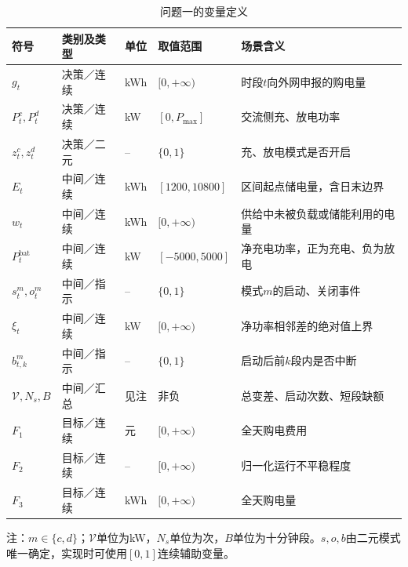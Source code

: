 \documentclass[withoutpreface,bwprint]{cumcmthesis}
\begin{document}
\begin{table}[htbp]
 \centering\small
 \caption{问题一的变量定义}\label{tab:q1-vars}
 \renewcommand{\arraystretch}{1.12}
 \begin{tabularx}{\textwidth}{p{2.3cm}p{2.35cm}p{1.05cm}p{2.0cm}X}
 \toprule
 符号&类别及类型&单位&取值范围&场景含义\\
 \midrule
 $g_t$&决策／连续&kWh&$[0,+\infty)$&时段$t$向外网申报的购电量\\
 $P_t^c,P_t^d$&决策／连续&kW&$[0,P_{\max}]$&交流侧充、放电功率\\
 $z_t^c,z_t^d$&决策／二元&--&$\{0,1\}$&充、放电模式是否开启\\
 $E_t$&中间／连续&kWh&$[1200,10800]$&区间起点储电量，含日末边界\\
 $w_t$&中间／连续&kWh&$[0,+\infty)$&供给中未被负载或储能利用的电量\\
 $P_t^{\mathrm{bat}}$&中间／连续&kW&$[-5000,5000]$&净充电功率，正为充电、负为放电\\
 $s_t^m,o_t^m$&中间／指示&--&$\{0,1\}$&模式$m$的启动、关闭事件\\
 $\xi_t$&中间／连续&kW&$[0,+\infty)$&净功率相邻差的绝对值上界\\
 $b_{t,k}^m$&中间／指示&--&$\{0,1\}$&启动后前$k$段内是否中断\\
 $\mathcal V,N_s,B$&中间／汇总&见注&非负&总变差、启动次数、短段缺额\\
 $F_1$&目标／连续&元&$[0,+\infty)$&全天购电费用\\
 $F_2$&目标／连续&--&$[0,+\infty)$&归一化运行不平稳程度\\
 $F_3$&目标／连续&kWh&$[0,+\infty)$&全天购电量\\
 \bottomrule
 \end{tabularx}

 \smallskip\parbox{\textwidth}{\footnotesize 注：$m\in\{c,d\}$；$\mathcal V$单位为kW，$N_s$单位为次，$B$单位为十分钟段。$s,o,b$由二元模式唯一确定，实现时可使用$[0,1]$连续辅助变量。}
\end{table}
\end{document}

